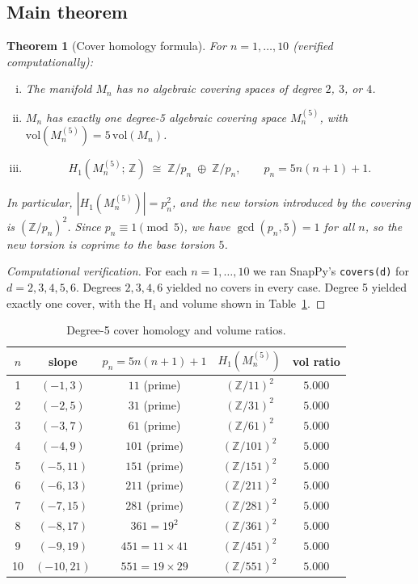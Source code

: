 \documentclass[11pt,a4paper]{article}
\newtheorem{theorem}{Theorem}
\theoremstyle{definition}
\newcommand{\ZZ}{\mathbb{Z}}
\newcommand{\vol}{\mathrm{vol}}
\newcommand{\Mn}{M_n}
\begin{document}
\subsection{Main theorem}

\begin{theorem}[Cover homology formula]
\label{thm:cover}
For $n = 1, \ldots, 10$ (verified computationally):
\begin{enumerate}[(i)]
\item The manifold $\Mn$ has no algebraic covering spaces of
  degree $2$, $3$, or $4$.
\item $\Mn$ has exactly one degree-5 algebraic covering space
  $\Mn^{(5)}$, with $\vol(\Mn^{(5)}) = 5\,\vol(\Mn)$.
\item
  \[
    H_1\!\left(\Mn^{(5)};\,\ZZ\right)
    \;\cong\;
    \ZZ/p_n \;\oplus\; \ZZ/p_n,
    \qquad
    p_n = 5n(n+1)+1.
  \]
\end{enumerate}
In particular, $|H_1(\Mn^{(5)})| = p_n^2$, and the new torsion
introduced by the covering is $(\ZZ/p_n)^2$.
Since $p_n \equiv 1 \pmod{5}$, we have $\gcd(p_n,5)=1$
for all $n$, so the new torsion is coprime to the base torsion $5$.
\end{theorem}

\begin{proof}[Computational verification]
For each $n=1,\ldots,10$ we ran SnapPy's \texttt{covers(d)} for
$d=2,3,4,5,6$.
Degrees $2,3,4,6$ yielded no covers in every case.
Degree 5 yielded exactly one cover, with the H₁ and volume shown
in Table~\ref{tab:covers}.
\end{proof}

\begin{table}[htbp]
\centering
\caption{Degree-5 cover homology and volume ratios.}
\label{tab:covers}
\begin{tabular}{ccccc}
\toprule
$n$ & slope & $p_n = 5n(n+1)+1$ & $H_1(M_n^{(5)})$ & vol ratio \\
\midrule
 1 & $(-1,3)$   &  $11$ (prime)    & $(\ZZ/11)^2$  & $5.000$ \\
 2 & $(-2,5)$   &  $31$ (prime)    & $(\ZZ/31)^2$  & $5.000$ \\
 3 & $(-3,7)$   &  $61$ (prime)    & $(\ZZ/61)^2$  & $5.000$ \\
 4 & $(-4,9)$   & $101$ (prime)    & $(\ZZ/101)^2$ & $5.000$ \\
 5 & $(-5,11)$  & $151$ (prime)    & $(\ZZ/151)^2$ & $5.000$ \\
 6 & $(-6,13)$  & $211$ (prime)    & $(\ZZ/211)^2$ & $5.000$ \\
 7 & $(-7,15)$  & $281$ (prime)    & $(\ZZ/281)^2$ & $5.000$ \\
 8 & $(-8,17)$  & $361=19^2$       & $(\ZZ/361)^2$ & $5.000$ \\
 9 & $(-9,19)$  & $451=11\times41$ & $(\ZZ/451)^2$ & $5.000$ \\
10 & $(-10,21)$ & $551=19\times29$ & $(\ZZ/551)^2$ & $5.000$ \\
\bottomrule
\end{tabular}
\end{table}
\end{document}
